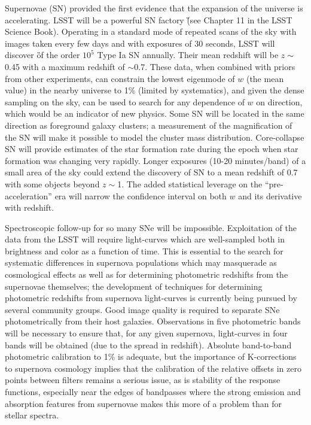 Supernovae (SN) provided the first evidence that the expansion of the
universe is accelerating. LSST will be a powerful SN factory
\G{(see Chapter 11 in the LSST Science Book)}. Operating in
a standard mode of repeated scans of the sky with images taken every few
days and with exposures of 30 seconds, LSST will discover 
\G{of the order $10^5$} Type Ia
SN annually. Their mean redshift will be $z\sim$0.45 with a maximum
redshift of $\sim$0.7. These data, when combined with priors from other
experiments, can constrain the lowest eigenmode of $w$ (\ie the mean
value) in the nearby universe to 1\% (limited by systematics),
and given the dense sampling on
the sky, can be used to search for any dependence of $w$ on direction,
which would be an indicator of new physics.  Some SN will be located in the
same direction as foreground galaxy clusters; a measurement of the
magnification of the SN will make it possible to model the cluster mass
distribution. Core-collapse SN will provide estimates of the star formation
rate during the epoch when star formation was changing very rapidly.
Longer exposures (10-20 minutes/band) of a small area of the sky could
extend the discovery of SN to a mean redshift of 0.7 with some objects
beyond $z\sim$1.  The added statistical leverage on the
``pre-acceleration'' era will narrow the confidence interval on both $w$
and its derivative with redshift.

Spectroscopic follow-up for so many SNe will be impossible. Exploitation of
the data from the LSST will require light-curves which are well-sampled both
in brightness and color as a function of time. This is essential to the
search for systematic differences in supernova populations which may
masquerade as cosmological effects as well as for determining photometric
redshifts from the supernovae themselves; the development of techniques for
determining photometric redshifts from supernova light-curves is currently
being pursued by several community groups. Good image quality is required
to separate SNe photometrically from their host galaxies. Observations in
five photometric bands will be necessary to ensure that, for any given
supernova, light-curves in four  bands will be obtained (due to the spread in
redshift). Absolute band-to-band photometric calibration to 1\% is adequate, but
the importance of K-corrections to supernova cosmology implies that the
calibration of the relative offsets in zero points between filters remains
a serious issue, as
is stability of the response functions, especially near the edges of
bandpasses where the strong emission and absorption features from supernovae
makes this more of a problem than for stellar spectra.

